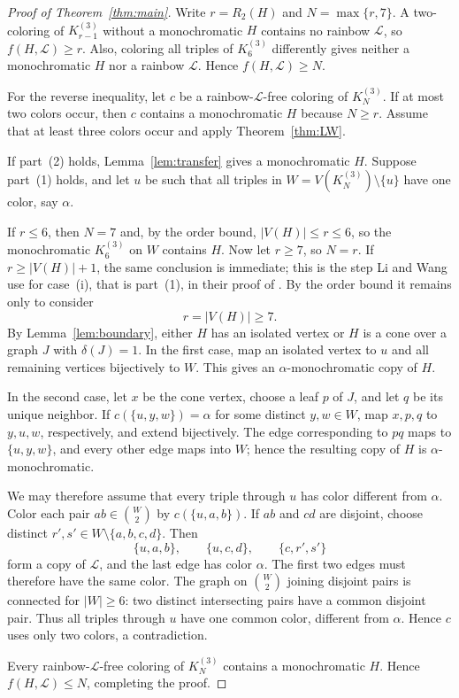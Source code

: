 \documentclass[11pt]{amsart}
\newcommand{\Lpath}{\mathcal L}
\begin{document}
\begin{proof}[Proof of Theorem~\ref{thm:main}]
Write $r=R_2(H)$ and $N=\max\{r,7\}$. A two-coloring of
$K_{r-1}^{(3)}$ without a monochromatic $H$ contains no rainbow
$\Lpath$, so $f(H,\Lpath)\ge r$. Also, coloring all triples of
$K_6^{(3)}$ differently gives neither a monochromatic $H$ nor a rainbow
$\Lpath$. Hence $f(H,\Lpath)\ge N$.

For the reverse inequality, let $c$ be a rainbow-$\Lpath$-free coloring
of $K_N^{(3)}$. If at most two colors occur, then $c$ contains a
monochromatic $H$ because $N\ge r$. Assume that at least three colors
occur and apply Theorem~\ref{thm:LW}.

If part~(2) holds, Lemma~\ref{lem:transfer} gives a monochromatic $H$.
Suppose part~(1) holds, and let $u$ be such that all triples in
$W=V(K_N^{(3)})\setminus\{u\}$ have one color, say $\alpha$.

If $r\le6$, then $N=7$ and, by the order bound, $|V(H)|\le r\le6$, so
the monochromatic $K_6^{(3)}$ on $W$ contains $H$. Now let $r\ge7$, so
$N=r$. If $r\ge|V(H)|+1$, the same conclusion is immediate; this is the
step Li and Wang use for case~(i), that is part~(1), in their proof of
\cite[Theorem~1.10]{LiWang}. By the order bound it remains only to
consider
\[
  r=|V(H)|\ge7.
\]
By Lemma~\ref{lem:boundary}, either $H$ has an isolated vertex or $H$ is
a cone over a graph $J$ with $\delta(J)=1$. In the first case, map an
isolated vertex to $u$ and all remaining vertices bijectively to $W$.
This gives an $\alpha$-monochromatic copy of $H$.

In the second case, let $x$ be the cone vertex, choose a leaf $p$ of $J$,
and let $q$ be its unique neighbor. If
$c(\{u,y,w\})=\alpha$ for some distinct $y,w\in W$, map
$x,p,q$ to $y,u,w$, respectively, and extend bijectively. The edge
corresponding to $pq$ maps to $\{u,y,w\}$, and every other edge maps into
$W$; hence the resulting copy of $H$ is $\alpha$-monochromatic.

We may therefore assume that every triple through $u$ has color different
from $\alpha$. Color each pair $ab\in\binom{W}{2}$ by
$c(\{u,a,b\})$. If $ab$ and $cd$ are disjoint, choose distinct
$r',s'\in W\setminus\{a,b,c,d\}$. Then
\[
  \{u,a,b\},\qquad \{u,c,d\},\qquad \{c,r',s'\}
\]
form a copy of $\Lpath$, and the last edge has color $\alpha$. The first
two edges must therefore have the same color. The graph on
$\binom{W}{2}$ joining disjoint pairs is connected for $|W|\ge6$: two
distinct intersecting pairs have a common disjoint pair. Thus all triples
through $u$ have one common color, different from $\alpha$. Hence $c$
uses only two colors, a contradiction.

Every rainbow-$\Lpath$-free coloring of $K_N^{(3)}$ contains a
monochromatic $H$. Hence $f(H,\Lpath)\le N$, completing the proof.
\end{proof}
\end{document}
